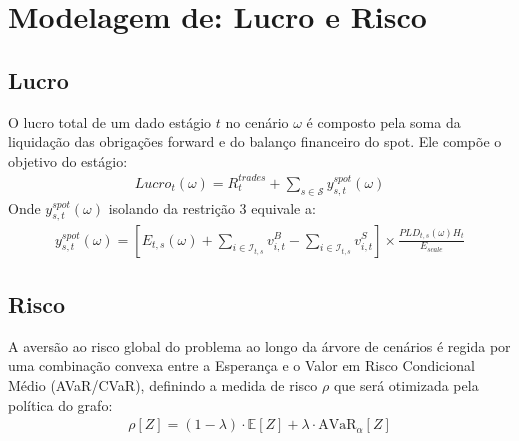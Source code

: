 \documentclass{article}
\begin{document}
\section{Modelagem de: Lucro e Risco}

\subsection{Lucro}
O lucro total de um dado estágio $t$ no cenário $\omega$ é composto pela soma da liquidação das obrigações forward e do balanço financeiro do spot. Ele compõe o objetivo do estágio:
\begin{align}
    Lucro_t(\omega) = R^{trades}_t + \sum_{s \in \mathcal{S}} y^{spot}_{s,t}(\omega)
\end{align}
Onde $y^{spot}_{s,t}(\omega)$ isolando da restrição 3 equivale a:
\begin{align}
    y^{spot}_{s,t}(\omega) = \left[ E_{t,s}(\omega) + \sum_{i \in \mathcal{I}_{t,s}} v^{B}_{i,t} - \sum_{i \in \mathcal{I}_{t,s}} v^{S}_{i,t} \right] \times \frac{PLD_{t,s}(\omega) H_t}{E_{scale}}
\end{align}

\subsection{Risco}
A aversão ao risco global do problema ao longo da árvore de cenários é regida por uma combinação convexa entre a Esperança e o Valor em Risco Condicional Médio (AVaR/CVaR), definindo a medida de risco $\rho$ que será otimizada pela política do grafo:
\begin{align}
    \rho[Z] = (1 - \lambda) \cdot \mathbb{E}[Z] + \lambda \cdot \text{AVaR}_{\alpha}[Z]
\end{align}
\end{document}
